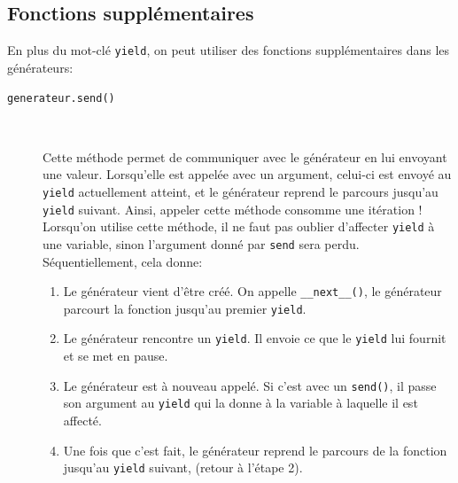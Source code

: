 \documentclass[a4paper, 10pt]{article}
\begin{document}
\subsection{Fonctions supplémentaires}
En plus du mot-clé \texttt{yield}, on peut utiliser des fonctions supplémentaires dans les générateurs:
\begin{description}
    \item[\texttt{generateur.send()}]~

    Cette méthode permet de communiquer avec le générateur en lui envoyant une valeur. Lorsqu'elle est appelée avec un argument, celui-ci est envoyé au \texttt{yield} actuellement atteint, et le générateur reprend le parcours jusqu'au \texttt{yield} suivant. Ainsi, appeler cette méthode consomme une itération ! Lorsqu'on utilise cette méthode, il ne faut pas oublier d'affecter \texttt{yield} à une variable, sinon l'argument donné par \texttt{send} sera perdu. Séquentiellement, cela donne:
    \begin{enumerate}
        \item Le générateur vient d'être créé. On appelle \texttt{__next__()}, le générateur parcourt la fonction jusqu'au premier \texttt{yield}.
        \item Le générateur rencontre un \texttt{yield}. Il envoie ce que le \texttt{yield} lui fournit et se met en pause.
        \item Le générateur est à nouveau appelé. Si c'est avec un \texttt{send()}, il passe son argument au \texttt{yield} qui la donne à la variable à laquelle il est affecté.
        \item Une fois que c'est fait, le générateur reprend le parcours de la fonction jusqu'au \texttt{yield} suivant, (retour à l'étape 2).
    \end{enumerate}

\end{description}
\end{document}
